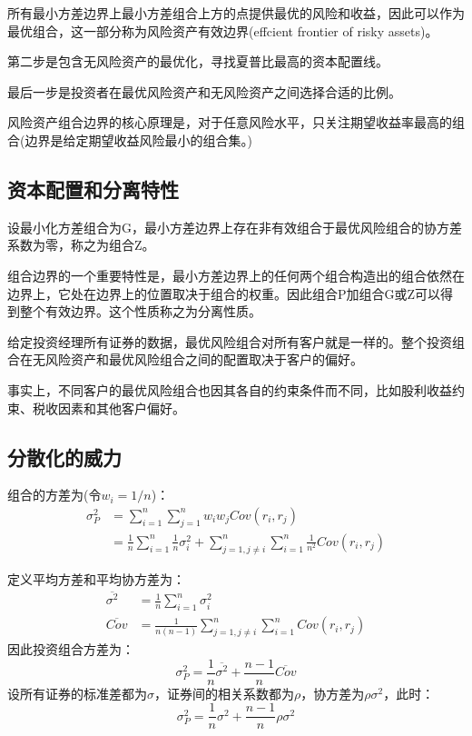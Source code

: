 \documentclass{article}
\begin{document}
所有最小方差边界上最小方差组合上方的点提供最优的风险和收益，因此可以作为最优组合，这一部分称为风险资产有效边界(effcient frontier of risky assets)。

第二步是包含无风险资产的最优化，寻找夏普比最高的资本配置线。

最后一步是投资者在最优风险资产和无风险资产之间选择合适的比例。

风险资产组合边界的核心原理是，对于任意风险水平，只关注期望收益率最高的组合(边界是给定期望收益风险最小的组合集。)

\subsection{资本配置和分离特性}
设最小化方差组合为G，最小方差边界上存在非有效组合于最优风险组合的协方差系数为零，称之为组合Z。

组合边界的一个重要特性是，最小方差边界上的任何两个组合构造出的组合依然在边界上，它处在边界上的位置取决于组合的权重。因此组合P加组合G或Z可以得到整个有效边界。这个性质称之为分离性质。

给定投资经理所有证券的数据，最优风险组合对所有客户就是一样的。整个投资组合在无风险资产和最优风险组合之间的配置取决于客户的偏好。

事实上，不同客户的最优风险组合也因其各自的约束条件而不同，比如股利收益约束、税收因素和其他客户偏好。

\subsection{分散化的威力}
组合的方差为(令$ w_i=1/n $)：
\begin{equation*}
	\begin{split}
	\sigma_P^2&=\sum_{i=1}^{n}\sum_{j=1}^{n}w_iw_jCov(r_i,r_j)\\
	&=\frac{1}{n}\sum_{i=1}^{n}\frac{1}{n}\sigma_i^2+\sum_{j=1,j\ne i}^{n}\sum_{i=1}^{n}\frac{1}{n^2}Cov(r_i,r_j)
	\end{split}
\end{equation*}

定义平均方差和平均协方差为：
\begin{equation*}
	\begin{split}
	\overline{\sigma^2}&=\frac{1}{n}\sum_{i=1}^{n}\sigma_i^2\\
	\overline{Cov}&=\frac{1}{n(n-1)}\sum_{j=1,j\ne i}^{n}\sum_{i=1}^{n}Cov(r_i,r_j)
	\end{split}
\end{equation*}
因此投资组合方差为：
\[
\sigma_P^2=\frac{1}{n}\overline{\sigma^2}+\frac{n-1}{n}\overline{Cov}
\]
设所有证券的标准差都为$ \sigma $，证券间的相关系数都为$ \rho $，协方差为$ \rho\sigma^2 $，此时：
\[
\sigma_P^2=\frac{1}{n}\sigma^2+\frac{n-1}{n}\rho\sigma^2
\]
\end{document}
